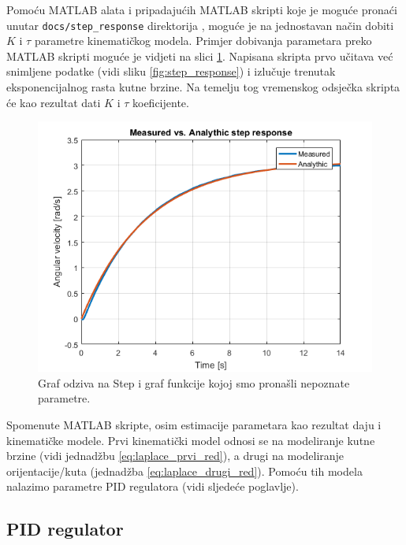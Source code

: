 \documentclass[times, utf8, diplomski, numeric]{templates/template}
\begin{document}
{{{            Pomoću MATLAB alata i pripadajućih MATLAB skripti koje je moguće pronaći unutar \texttt{docs/step\_response} direktorija \cite{link_na_fit}, moguće je na jednostavan način dobiti $K$ i $\tau$ parametre kinematičkog modela. Primjer dobivanja parametara preko MATLAB skripti moguće je vidjeti na slici \ref{fig:fittana_funkcija}. Napisana skripta prvo učitava već snimljene podatke (vidi sliku \ref{fig:step_response}) i izlučuje trenutak eksponencijalnog rasta kutne brzine. Na temelju tog vremenskog odsječka skripta će kao rezultat dati $K$ i $\tau$ koeficijente. 

            \begin{figure}[htb]
            \centering
            \includegraphics[width=1.0\textwidth]{other/fittana_funkcija.png}
            \caption{Graf odziva na Step i graf funkcije kojoj smo pronašli nepoznate parametre.}
            \label{fig:fittana_funkcija}
            \end{figure}

            Spomenute MATLAB skripte, osim estimacije parametara kao rezultat daju i kinematičke modele. Prvi kinematički model odnosi se na modeliranje kutne brzine (vidi jednadžbu \ref{eq:laplace_prvi_red}), a drugi na modeliranje orijentacije/kuta (jednadžba \ref{eq:laplace_drugi_red}). Pomoću tih modela nalazimo parametre PID regulatora (vidi sljedeće poglavlje).
        }

        \subsection{PID regulator}{
        \label{subsection:pid_regulator}

}}}
\end{document}
